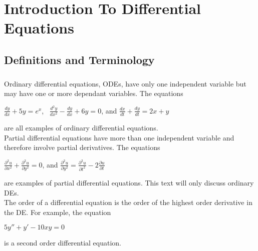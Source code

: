 \documentclass{report}
\begin{document}
    \chapter{Introduction To Differential Equations}
    \section{Definitions and Terminology}
        \paragraph{}Ordinary differential equations, ODEs, have only one independent variable but may have one or more 
        dependant variables. The equations 
        \begin{center}
            \(\frac{dy}{dx}+5y=e^x\), \, \(\frac{d^2y}{dx^2}-\frac{dy}{dx}+6y = 0\), and \(\frac{dx}{dt}+
            \frac{dy}{dt} = 2x+y\)
        \end{center}
        are all examples of ordinary differential equations.\\
        
        Partial differential equations have more than one independent variable and therefore involve partial 
        derivatives. The equations 
        \begin{center}
            \(\frac{\partial^2u}{\partial x^2}+\frac{\partial^2u}{\partial y^2} = 0\), and 
            \(\frac{\partial^2u}{\partial y^2} = \frac{\partial^2u}{\partial t^2} - 2\frac{\partial u}{
                \partial t}\)
        \end{center}
        are examples of partial differential equations. This text will only discuss ordinary DEs.\\
        
        The order of a differential equation is the order of the highest order derivative in the DE. For example, the 
        equation
        \begin{center}
            \(5y''+y'-10xy=0\)
        \end{center}
        is a second order differential equation.\\
\end{document}
